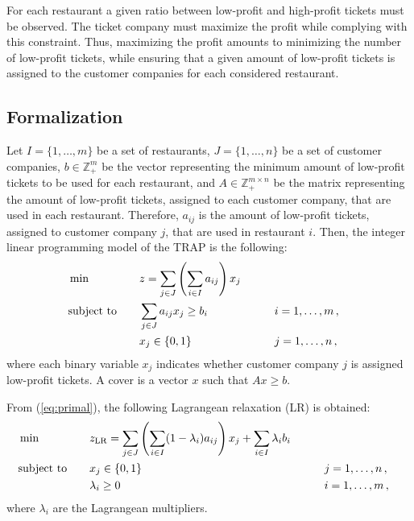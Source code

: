 \documentclass[runningheads]{llncs}
\begin{document}
For each restaurant a given ratio between low-profit and high-profit tickets must be observed. 
The ticket company must maximize the profit while complying with this constraint. Thus, maximizing the profit amounts to minimizing the number of low-profit tickets, while ensuring that a given amount of low-profit tickets is assigned to the customer companies for each considered restaurant.

\subsection{Formalization}
\label{subsec:problem:formalization}

Let $I = \{1,\dots,m\}$ be a set of restaurants, $J = \{1,\dots,n\}$ be a set of customer companies, $b \in \mathbb{Z}_{+}^{m}$ be the vector representing the minimum amount of low-profit tickets to be used for each restaurant, and $A \in \mathbb{Z}_{+}^{m \times n}$ be the matrix representing the amount of low-profit tickets, assigned to each customer company, that are used in each restaurant. Therefore, $a_{ij}$ is the amount of low-profit tickets, assigned to customer company $j$, that are used in restaurant $i$. Then, the integer linear programming model of the TRAP is the following:
\begin{alignat}{3}
  &\min & \quad & z = \sum_{j \in J} \left( \sum_{i \in I} a_{ij} \right) x_j \label{eq:primal}\\
  &\text{subject to}  &       & \sum_{j \in J} a_{ij} x_j \ge b_i & \qquad & i = 1,\dots,m \, , \notag\\
  &                   &       & x_j \in \{0,1\}  &\qquad& j = 1,\dots,n \, , \notag
\end{alignat}
where each binary variable $x_j$ indicates whether customer company $j$ is assigned low-profit tickets. A cover is a vector $x$ such that $Ax \ge b$.

From (\ref{eq:primal}), the following Lagrangean relaxation (LR) is obtained:
\begin{alignat}{3}
  &\min & \quad & z_{\text{LR}} = \sum_{j \in J} \left( \sum_{i \in I} (1 - \lambda_i) a_{ij} \right) x_j + \sum_{i \in I} \lambda_i b_i \label{eq:lagrangean}\\
  &\text{subject to}  &       & x_j \in \{0,1\} & \qquad & j = 1,\dots,n \, , \notag\\
  &                   &       & \lambda_i \ge 0  & \qquad & i = 1,\dots,m \, , \notag
\end{alignat}
where $\lambda_i$ are the Lagrangean multipliers.
\end{document}
